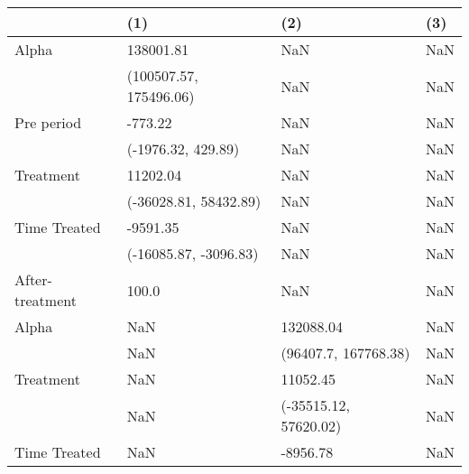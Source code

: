 \begin{tabular}{llll}
\toprule
{} &                     (1) &                    (2) &                   (3) \\
\midrule
Alpha           &               138001.81 &                    NaN &                   NaN \\
                &  (100507.57, 175496.06) &                    NaN &                   NaN \\
Pre period      &                 -773.22 &                    NaN &                   NaN \\
                &      (-1976.32, 429.89) &                    NaN &                   NaN \\
Treatment       &                11202.04 &                    NaN &                   NaN \\
                &   (-36028.81, 58432.89) &                    NaN &                   NaN \\
Time Treated    &                -9591.35 &                    NaN &                   NaN \\
                &   (-16085.87, -3096.83) &                    NaN &                   NaN \\
After-treatment &                   100.0 &                    NaN &                   NaN \\
Alpha           &                     NaN &              132088.04 &                   NaN \\
                &                     NaN &   (96407.7, 167768.38) &                   NaN \\
Treatment       &                     NaN &               11052.45 &                   NaN \\
                &                     NaN &  (-35515.12, 57620.02) &                   NaN \\
Time Treated    &                     NaN &               -8956.78 &                   NaN \\
 

\end{tabular}
